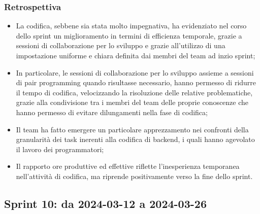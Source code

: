 \documentclass[10pt, a4paper]{article}
\begin{document}
\subsubsection{Retrospettiva}
\begin{itemize}
    \item La codifica, sebbene sia stata molto impegnativa, ha evidenziato nel corso dello sprint un miglioramento in termini di efficienza temporale, grazie a sessioni di collaborazione per lo sviluppo e grazie all'utilizzo di una impostazione uniforme e chiara definita dai membri del team ad inzio sprint;
     \item In particolare, le sessioni di collaborazione per lo sviluppo assieme a sessioni di pair programming quando risultasse necessario, hanno permesso di ridurre il tempo di codifica, velocizzando la risoluzione 
    delle relative problematiche, grazie alla condivisione tra i membri del team delle proprie conoscenze che hanno permesso di evitare dilungamenti nella fase di codifica;
    \item Il team ha fatto emergere un particolare apprezzamento nei confronti della granularità dei task inerenti alla codifica di backend, i quali hanno agevolato il lavoro dei programmatori;
    \item Il rapporto ore produttive ed effettive riflette l'inesperienza temporanea nell'attività di codifica, ma riprende positivamente verso la fine dello sprint.
\end{itemize}


\subsection{Sprint 10: da 2024-03-12 a 2024-03-26}
\end{document}
